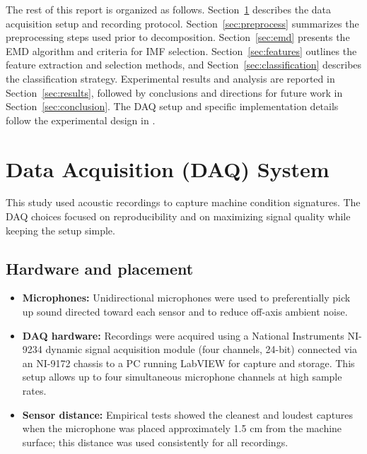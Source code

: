 \documentclass[12pt,a4paper]{article}
\begin{document}
The rest of this report is organized as follows. Section~\ref{sec:daq} describes the data acquisition setup and recording protocol. Section~\ref{sec:preprocess} summarizes the preprocessing steps used prior to decomposition. Section~\ref{sec:emd} presents the EMD algorithm and criteria for IMF selection. Section~\ref{sec:features} outlines the feature extraction and selection methods, and Section~\ref{sec:classification} describes the classification strategy. Experimental results and analysis are reported in Section~\ref{sec:results}, followed by conclusions and directions for future work in Section~\ref{sec:conclusion}. The DAQ setup and specific implementation details follow the experimental design in \cite{Verma2016}.

\section{Data Acquisition (DAQ) System}
\label{sec:daq}

This study used acoustic recordings to capture machine condition signatures. The DAQ choices focused on reproducibility and on maximizing signal quality while keeping the setup simple.

\subsection{Hardware and placement}
\begin{itemize}
  \item \textbf{Microphones:} Unidirectional microphones were used to preferentially pick up sound directed toward each sensor and to reduce off-axis ambient noise.
  \item \textbf{DAQ hardware:} Recordings were acquired using a National Instruments NI-9234 dynamic signal acquisition module (four channels, 24-bit) connected via an NI-9172 chassis to a PC running LabVIEW for capture and storage. This setup allows up to four simultaneous microphone channels at high sample rates.
  \item \textbf{Sensor distance:} Empirical tests showed the cleanest and loudest captures when the microphone was placed approximately 1.5 cm from the machine surface; this distance was used consistently for all recordings.
\end{itemize}
\end{document}
